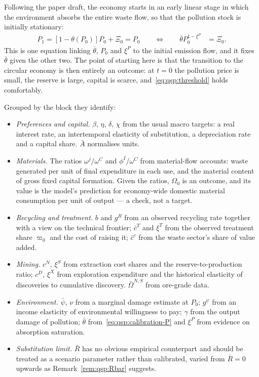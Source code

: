  Following the paper draft, the economy starts in an early linear stage
in which the environment absorbs the entire waste flow, so that the pollution stock is initially
stationary:
\begin{align}
P_1 = \left[1-\theta\!\left(P_0\right)\right]P_0+\Xi_0 = P_0
\qquad\Longleftrightarrow\qquad
\bar\theta P_0^{1-\xi^P} &= \Xi_0 .
\label{eq:qsp:calibration-P}
\end{align}
This is one equation linking $\bar\theta$, $P_0$ and $\xi^P$ to the initial emission flow, and it fixes
$\bar\theta$ given the other two. The point of starting here is that the transition to the circular
economy is then entirely an outcome: at $t=0$ the pollution price is small, the reserve is large,
capital is scarce, and~\eqref{eq:qsp:threshold} holds comfortably.

 Grouped by the block they identify:
\begin{itemize}[leftmargin=1.6em,itemsep=0.15em]
\item \emph{Preferences and capital.} $\beta$, $\eta$, $\delta$, $\chi$ from the usual macro targets:
a real interest rate, an intertemporal elasticity of substitution, a depreciation rate and a capital
share. $\bar A$ normalises units.
\item \emph{Materials.} The ratios $\omega^j/\omega^C$ and $\phi^I/\omega^C$ from material-flow
accounts: waste generated per unit of final expenditure in each use, and the material content of gross
fixed capital formation. Given the ratios, $\Omega_0$ is an outcome, and its value is the model's
prediction for economy-wide domestic material consumption per unit of output --- a check, not a target.
\item \emph{Recycling and treatment.} $b$ and $g^R$ from an observed recycling rate together with a view
on the technical frontier; $\bar c^T$ and $\xi^T$ from the observed treatment share $\varpi_0$ and the
cost of raising it; $\bar c^c$ from the waste sector's share of value added.
\item \emph{Mining.} $c^N$, $\xi^S$ from extraction cost shares and the reserve-to-production ratio;
$c^D$, $\xi^X$ from exploration expenditure and the historical elasticity of discoveries to cumulative
discovery. $\bar\Omega^{N,S}$ from ore-grade data.
\item \emph{Environment.} $\bar\psi$, $\nu$ from a marginal damage estimate at $P_0$;
$g^\psi$ from an income elasticity of environmental willingness to pay; $\gamma$ from the output damage
of pollution; $\bar\theta$ from~\eqref{eq:qsp:calibration-P} and $\xi^P$ from evidence on absorption
saturation.
\item \emph{Substitution limit.} $\bar R$ has no obvious empirical counterpart and should be treated as
a scenario parameter rather than calibrated, varied from $\bar R=0$ upwards as
Remark~\ref{rem:qsp:Rbar} suggests.
\end{itemize}

